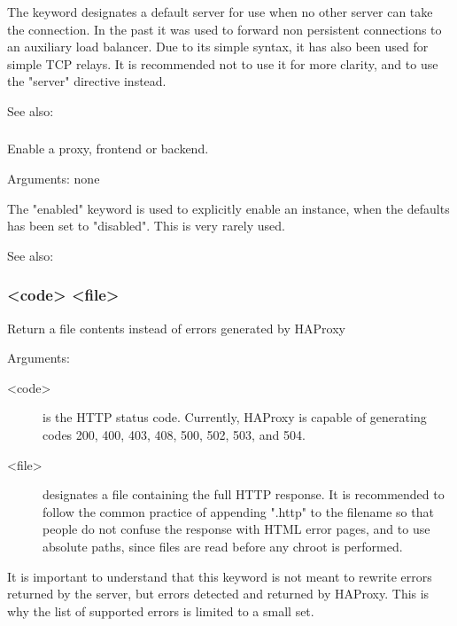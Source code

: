  The  keyword designates a default server for use when no other
  server can take the connection. In the past it was used to forward non
  persistent connections to an auxiliary load balancer. Due to its simple
  syntax, it has also been used for simple TCP relays. It is recommended not to
  use it for more clarity, and to use the "server" directive instead.


See also: 

\subsubsection[enabled]{}
  Enable a proxy, frontend or backend.
  
  
  Arguments: none

  The "enabled" keyword is used to explicitly enable an instance, when the
  defaults has been set to "disabled". This is very rarely used.


See also: 

\subsubsection[errorfile]{ <code> <file>}
  Return a file contents instead of errors generated by HAProxy
  

  Arguments:
  \begin{description}
  \item[<code>]    is the HTTP status code. Currently, HAProxy is capable of
              generating codes 200, 400, 403, 408, 500, 502, 503, and 504.

   \item[<file>]    designates a file containing the full HTTP response. It is
              recommended to follow the common practice of appending ".http" to
              the filename so that people do not confuse the response with HTML
              error pages, and to use absolute paths, since files are read
              before any chroot is performed.
  \end{description}

  It is important to understand that this keyword is not meant to rewrite
  errors returned by the server, but errors detected and returned by HAProxy.
  This is why the list of supported errors is limited to a small set.

